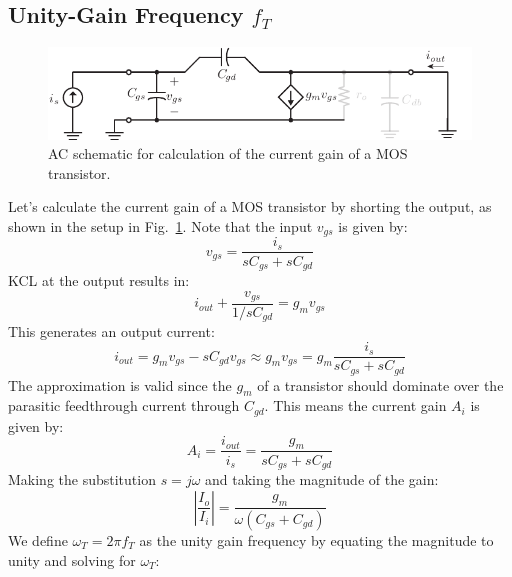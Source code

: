 \subsection{Unity-Gain Frequency \texorpdfstring{$f_T$}{}}
\begin{figure}[tb]
\centering
\includegraphics[scale=1]{hybrid_pi_ft}
\caption{AC schematic for calculation of the current gain of a MOS transistor.}
\label{fig:hybrid_pi_ft}
\end{figure}
Let's calculate the current gain of a MOS transistor by shorting the output, as shown in the setup in Fig.~\ref{fig:hybrid_pi_ft}.  Note that the input $v_{gs}$ is given by:
    \begin{equation}
        {v_{gs}} = \frac{{{i_s}}}{{s{C_{gs}} + s{C_{gd}}}}
    \end{equation}
KCL at the output results in:
    \begin{equation} 
        {i_{out}} + \frac{{{v_{gs}}}}{{1/s{C_{gd}}}} = {g_m}{v_{gs}} 
    \end{equation}
This generates an output current:
    \begin{equation} 
        {i_{out}} = {g_m}{v_{gs}} - s{C_{gd}}{v_{gs}} \approx {g_m}{v_{gs}} = {g_m}\frac{{{i_s}}}{{s{C_{gs}} + s{C_{gd}}}}
    \end{equation}
The approximation is valid since the $g_m$ of a transistor should dominate over the parasitic feedthrough current through $C_{gd}$.  This means the current gain $A_i$ is given by:
    \begin{equation} 
        {A_i} = \frac{{{i_{out}}}}{{{i_s}}} = \frac{{{g_m}}}{{s{C_{gs}} + s{C_{gd}}}} 
    \end{equation}
Making the substitution $s = j\omega$ and taking the magnitude of the gain:
    \begin{equation} 
        \left| {\frac{{{I_o}}}{{{I_i}}}} \right| = \frac{{{g_m}}}{{\omega ({C_{gs}} + {C_{gd}})}} 
    \end{equation}
We define $\omega_T = 2\pi f_T$ as the unity gain frequency by equating the magnitude to unity and solving for $\omega_T$:
